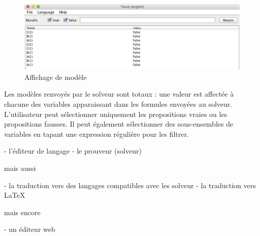 \begin{figure}[htbp]
\centering
\includegraphics[scale=0.27]{figures/ExampleOfAModel.png}
  \caption{Affichage de modèle}
  \label{fig:ExampleOfAModel}
\end{figure}

Les modèles renvoyés par le solveur sont totaux : une valeur est affectée à chacune des variables apparaissant dans les formules envoyées au solveur. L'utilisateur peut sélectionner uniquement les propositions vraies ou les propositions fausses. Il peut également sélectionner des sous-ensembles de variables en tapant une expression régulière pour les filtrer.









- l'éditeur de langage \touist
- le prouveur (solveur)

mais aussi

- la traduction vers des langages compatibles avec les solveur
- la traduction vers \LaTeX

mais encore

- un éditeur web
